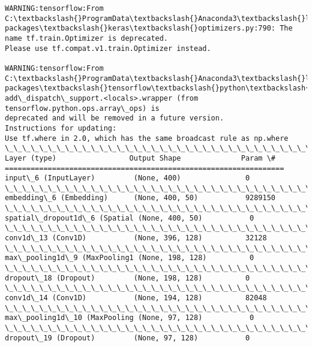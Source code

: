 \documentclass[11pt]{article}
\begin{document}
\begin{Verbatim}[commandchars=\\\{\}]
WARNING:tensorflow:From C:\textbackslash{}ProgramData\textbackslash{}Anaconda3\textbackslash{}lib\textbackslash{}site-
packages\textbackslash{}keras\textbackslash{}optimizers.py:790: The name tf.train.Optimizer is deprecated.
Please use tf.compat.v1.train.Optimizer instead.

WARNING:tensorflow:From C:\textbackslash{}ProgramData\textbackslash{}Anaconda3\textbackslash{}lib\textbackslash{}site-
packages\textbackslash{}tensorflow\textbackslash{}python\textbackslash{}ops\textbackslash{}nn\_impl.py:180:
add\_dispatch\_support.<locals>.wrapper (from tensorflow.python.ops.array\_ops) is
deprecated and will be removed in a future version.
Instructions for updating:
Use tf.where in 2.0, which has the same broadcast rule as np.where
\_\_\_\_\_\_\_\_\_\_\_\_\_\_\_\_\_\_\_\_\_\_\_\_\_\_\_\_\_\_\_\_\_\_\_\_\_\_\_\_\_\_\_\_\_\_\_\_\_\_\_\_\_\_\_\_\_\_\_\_\_\_\_\_\_
Layer (type)                 Output Shape              Param \#
=================================================================
input\_6 (InputLayer)         (None, 400)               0
\_\_\_\_\_\_\_\_\_\_\_\_\_\_\_\_\_\_\_\_\_\_\_\_\_\_\_\_\_\_\_\_\_\_\_\_\_\_\_\_\_\_\_\_\_\_\_\_\_\_\_\_\_\_\_\_\_\_\_\_\_\_\_\_\_
embedding\_6 (Embedding)      (None, 400, 50)           9289150
\_\_\_\_\_\_\_\_\_\_\_\_\_\_\_\_\_\_\_\_\_\_\_\_\_\_\_\_\_\_\_\_\_\_\_\_\_\_\_\_\_\_\_\_\_\_\_\_\_\_\_\_\_\_\_\_\_\_\_\_\_\_\_\_\_
spatial\_dropout1d\_6 (Spatial (None, 400, 50)           0
\_\_\_\_\_\_\_\_\_\_\_\_\_\_\_\_\_\_\_\_\_\_\_\_\_\_\_\_\_\_\_\_\_\_\_\_\_\_\_\_\_\_\_\_\_\_\_\_\_\_\_\_\_\_\_\_\_\_\_\_\_\_\_\_\_
conv1d\_13 (Conv1D)           (None, 396, 128)          32128
\_\_\_\_\_\_\_\_\_\_\_\_\_\_\_\_\_\_\_\_\_\_\_\_\_\_\_\_\_\_\_\_\_\_\_\_\_\_\_\_\_\_\_\_\_\_\_\_\_\_\_\_\_\_\_\_\_\_\_\_\_\_\_\_\_
max\_pooling1d\_9 (MaxPooling1 (None, 198, 128)          0
\_\_\_\_\_\_\_\_\_\_\_\_\_\_\_\_\_\_\_\_\_\_\_\_\_\_\_\_\_\_\_\_\_\_\_\_\_\_\_\_\_\_\_\_\_\_\_\_\_\_\_\_\_\_\_\_\_\_\_\_\_\_\_\_\_
dropout\_18 (Dropout)         (None, 198, 128)          0
\_\_\_\_\_\_\_\_\_\_\_\_\_\_\_\_\_\_\_\_\_\_\_\_\_\_\_\_\_\_\_\_\_\_\_\_\_\_\_\_\_\_\_\_\_\_\_\_\_\_\_\_\_\_\_\_\_\_\_\_\_\_\_\_\_
conv1d\_14 (Conv1D)           (None, 194, 128)          82048
\_\_\_\_\_\_\_\_\_\_\_\_\_\_\_\_\_\_\_\_\_\_\_\_\_\_\_\_\_\_\_\_\_\_\_\_\_\_\_\_\_\_\_\_\_\_\_\_\_\_\_\_\_\_\_\_\_\_\_\_\_\_\_\_\_
max\_pooling1d\_10 (MaxPooling (None, 97, 128)           0
\_\_\_\_\_\_\_\_\_\_\_\_\_\_\_\_\_\_\_\_\_\_\_\_\_\_\_\_\_\_\_\_\_\_\_\_\_\_\_\_\_\_\_\_\_\_\_\_\_\_\_\_\_\_\_\_\_\_\_\_\_\_\_\_\_
dropout\_19 (Dropout)         (None, 97, 128)           0

\end{Verbatim}
\end{document}

